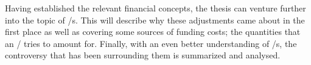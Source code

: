 \documentclass[main.tex]{subfiles}
\begin{document}
    Having established the relevant financial concepts, 
    the thesis can venture further into the topic of \FVA/s.
    This  will describe why these adjustments came about in the first place
    as well as covering some sources of funding costs; 
    the quantities that an \FVA/ tries to amount for.
    Finally, with an even better understanding of \FVA/s, 
    the controversy that has been surrounding them is summarized and analysed. 
    
\end{document}
